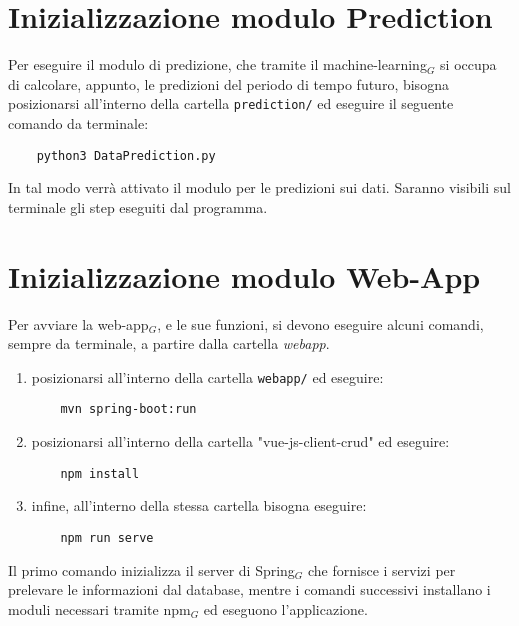 \section{Inizializzazione modulo Prediction}\label{ProceduraDiInstallazioneInizializzazioneModuloPrediction}
Per eseguire il modulo di predizione, che tramite il machine-learning$_G$ si occupa di calcolare, appunto, le predizioni del periodo di tempo futuro, bisogna posizionarsi all'interno della cartella \texttt{prediction/} ed eseguire il seguente comando da terminale:

\begin{lstlisting}
    python3 DataPrediction.py
\end{lstlisting}
In tal modo verrà attivato il modulo per le predizioni sui dati.
Saranno visibili sul terminale gli step eseguiti dal programma.


\section{Inizializzazione modulo Web-App}\label{ProceduraDiInstallazioneInizializzazioneModuloWebApp}
Per avviare la web-app$_G$, e le sue funzioni, si devono eseguire alcuni comandi, sempre da terminale, a partire dalla cartella \textit{webapp}.
\begin{enumerate}
  \item posizionarsi all'interno della cartella \texttt{webapp/} ed eseguire:
  \begin{lstlisting}
    mvn spring-boot:run
  \end{lstlisting}
  \item posizionarsi all'interno della cartella "vue-js-client-crud" ed eseguire:
  \begin{lstlisting}
    npm install
  \end{lstlisting}
  \item infine, all'interno della stessa cartella bisogna eseguire:
  \begin{lstlisting}
    npm run serve
  \end{lstlisting}
\end{enumerate}
Il primo comando inizializza il server di Spring$_G$ che fornisce i servizi per prelevare le informazioni dal database, mentre i comandi successivi installano i moduli necessari tramite npm$_G$ ed eseguono l'applicazione.

